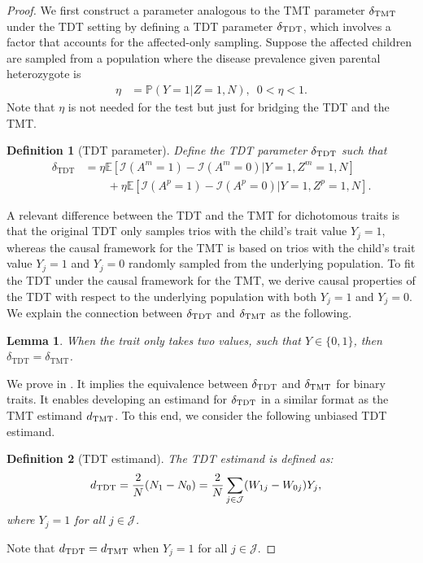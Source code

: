 \documentclass[12pt]{extarticle}
\newtheorem{lem}{Lemma}%
\newtheorem{defin}{Definition}%
\newcommand{\pp}{\mathbb{P}}
\newcommand{\E}{\mathbb{E}}
\newcommand{\indicator}{\mathcal{I}}
\newcommand{\tmt}{{\normalfont \text{TMT}}}
\newcommand{\tdt}{{\normalfont \text{TDT}}}
\newcommand{\cJ}{\mathcal{J}}
\begin{document}
{\begin{proof} We first construct a parameter analogous to the TMT parameter $\delta_{\tmt}$ under the TDT setting by defining a TDT parameter $\delta_{\tdt}$, which involves a factor that accounts for the affected-only sampling. Suppose the affected children are sampled from a population where the disease prevalence given parental heterozygote is 
\begin{align*}
\eta &= \pp(Y=1|Z=1,N),\,\,\, 0< \eta <1.
\end{align*} Note that $\eta$ is not needed for the test but just for bridging the TDT and the TMT. 

\begin{defin}[TDT parameter]\label{def:tdt_param}
Define the TDT parameter $\delta_{\tdt}$ such that  
\begin{align*}
\delta_{\text{TDT}} &= \eta \E[\indicator(A^m=1)-\indicator(A^m=0)|Y=1,Z^m=1,N] ~ \\
& \qquad + \eta \E[\indicator(A^p=1)-\indicator(A^p=0)|Y=1,Z^p=1,N].
\end{align*}
\end{defin} 

\noindent A relevant difference between the TDT and the TMT for dichotomous traits is that the original TDT only samples trios with the child's trait value $Y_j=1$, whereas the causal framework for the TMT is based on trios with the child's trait value $Y_j=1$ and $Y_j=0$ randomly sampled from the underlying population. To fit the TDT under the causal framework for the TMT, we derive causal properties of the TDT with respect to the underlying population with both $Y_j=1$ and $Y_j=0$. We explain the connection between $\delta_{\tdt}$ and $\delta_{\tmt}$ as the following.

\begin{lem} \label{lem:delta_tdt} 
When the trait only takes two values, such that $Y \in \{0,1\}$, then $\delta_{\text{TDT}}=\delta_{\text{TMT}}$. 
\end{lem} 

\noindent We prove  in . It implies the equivalence between $\delta_{\tdt}$ and $\delta_{\tmt}$ for binary traits. It enables developing an estimand for $\delta_{\tdt}$ in a similar format as the TMT estimand $d_{\tmt}$. To this end, we consider the following unbiased TDT estimand. 

\begin{defin}[TDT estimand] \label{def:dtdt}
The TDT estimand is defined as:
\begin{align}
& d_{\tdt} = \frac{2}{N}(N_1-N_0) = \frac{2}{N}\sum_{j\in \cJ}(W_{1j}-W_{0j})Y_j,
\end{align}
where $Y_j = 1$ for all $j \in \cJ$.
\end{defin}
\noindent Note that $d_{\tdt} = d_{\tmt}$ when $Y_j = 1$ for all $j \in \cJ$.


\end{proof}}
\end{document}
